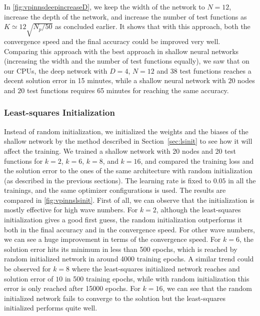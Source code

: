 In \autoref{fig:vpinnsdeepincreaseD}, we keep the width of the network to $N=12$, increase the depth of the network, and increase the number of test functions as $K \simeq 12\sqrt{N_p/50}$ as concluded earlier. It shows that with this approach, both the convergence speed and the final accuracy could be improved very well. Comparing this approach with the best approach in shallow neural networks (increasing the width and the number of test functions equally), we saw that on our CPUs, the deep network with $D=4$, $N=12$ and 38 test functions reaches a decent solution error in 15 minutes, while a shallow neural network with $20$ nodes and $20$ test functions requires 65 minutes for reaching the same accuracy.

\subsubsection{Least-squares Initialization} \label{sec:lsinitresults}
Instead of random initialization, we initialized the weights and the biases of the shallow network by the method described in Section~\ref{sec:lsinit} to see how it will affect the training. We trained a shallow network with 20 nodes and 20 test functions for $k=2$, $k=6$, $k=8$, and $k=16$, and compared the training loss and the solution error to the ones of the same architecture with random initialization (as described in the previous sections). The learning rate is fixed to $0.05$ in all the trainings, and the same optimizer configurations is used. The results are compared in \autoref{fig:vpinnslsinit}. First of all, we can observe that the initialization is mostly effective for high wave numbers. For $k=2$, although the least-squares initialization gives a good first guess, the random initialization outperforms it both in the final accuracy and in the convergence speed. For other wave numbers, we can see a huge improvement in terms of the convergence speed. For $k=6$, the solution error hits its minimum in less than 500 epochs, which is reached by random initialized network in around 4000 training epochs. A similar trend could be observed for $k=8$ where the least-squares initialized network reaches and solution error of $10$ in 500 training epochs, while with random initialization this error is only reached after 15000 epochs. For $k=16$, we can see that the random initialized network fails to converge to the solution but the least-squares initialized performs quite well.

